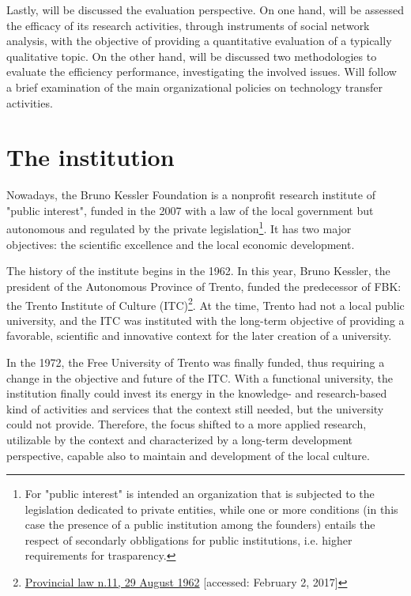 Lastly, will be discussed the evaluation perspective. On one hand, will be assessed the efficacy of its research activities, through instruments of social network analysis, with the objective of providing a quantitative evaluation of a typically qualitative topic. On the other hand, will be discussed two methodologies to evaluate the efficiency performance, investigating the involved issues. Will follow a brief examination of the main organizational policies on technology transfer activities.

\section{The institution}

Nowadays, the Bruno Kessler Foundation is a nonprofit research institute of "public interest", funded in the 2007 with a law of the local government but autonomous and regulated by the private legislation\footnote{For "public interest" is intended an organization that is subjected to the legislation dedicated to private entities, while one or more conditions (in this case the presence of a public institution among the founders) entails the respect of secondarly obbligations for public institutions, i.e. higher requirements for trasparency.}. It has two major objectives: the scientific excellence and the local economic development.

The history of the institute begins in the 1962. In this year, Bruno Kessler, the president of the Autonomous Province of Trento, funded the predecessor of FBK: the Trento Institute of Culture (ITC)\footnote{
	\href{http://www.consiglio.provincia.tn.it/leggi-e-archivi/codice-provinciale/archivio/Pages/Legge\%20provinciale\%2029\%20agosto\%201962,\%20n.\%2011_565.aspx}
	{Provincial law n.11, 29 August 1962}
	[accessed: February 2, 2017]
}. At the time, Trento had not a local public university, and the ITC was instituted with the long-term objective of providing a favorable, scientific and innovative context for the later creation of a university. 

In the 1972, the Free University of Trento was finally funded, thus requiring a change in the objective and future of the ITC. With a functional university, the institution finally could invest its energy in the knowledge- and research-based kind of activities and services that the context still needed, but the university could not provide. Therefore, the focus shifted to a more applied research, utilizable by the context and characterized by a long-term development perspective, capable also to maintain and development of the local culture.

